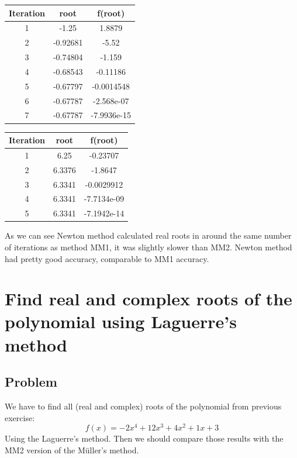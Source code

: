 \documentclass[12pt]{report}
\begin{document}
\begin{center}
  \begin{tabular}{| c  c c |}
\hline
Iteration & root         & f(root) \\
\hline
 1  &       -1.25   &       1.8879 \\
 \hline
 2  &    -0.92681  &         -5.52 \\
 \hline
 3  &   -0.74804   &       -1.159 \\
 \hline
 4  &   -0.68543   &     -0.11186 \\
 \hline
 5  &   -0.67797   &   -0.0014548 \\
 \hline
 6  &    -0.67787  &    -2.568e-07 \\
 \hline
 7  &   -0.67787   & -7.9936e-15 \\
 \hline
\end{tabular}
\end{center}

\begin{center}
  \begin{tabular}{| c  c c |}
\hline
Iteration & root         & f(root) \\
\hline
 1   &     6.25   &     -0.23707 \\
 \hline
 2   &   6.3376   &      -1.8647 \\
 \hline
 3   &  6.3341    &  -0.0029912 \\
 \hline
 4   &   6.3341   & -7.7134e-09 \\
 \hline
 5   &   6.3341   &  -7.1942e-14 \\
 \hline
\end{tabular}
\end{center}

As we can see Newton method calculated real roots in around the same number of iterations as method MM1, it was slightly slower than MM2. Newton method had pretty good accuracy, comparable to MM1 accuracy.


\chapter{Find real and complex roots of the polynomial using Laguerre's method}

\section{Problem}
We have to find all (real and complex) roots of the polynomial from previous exercise:
\[ f(x) = -2x^4+12x^3+4x^2+1x+3 \]
Using the Laguerre's method. Then we should compare those results with the MM2 version of the  M{\"u}ller's method.
\end{document}
